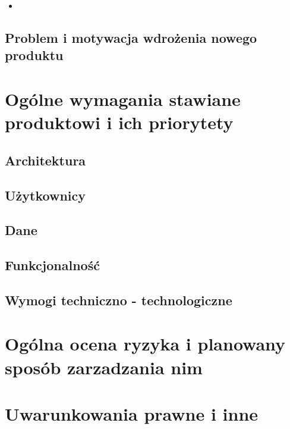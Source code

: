\documentclass[a4paper,10pt]{article}
\begin{document}
\begin{itemize}
 \item 
\end{itemize}

\subsection{Problem i motywacja wdrożenia nowego produktu}
\paragraph{} 


\section{Ogólne wymagania stawiane produktowi i ich priorytety}

\subsection{Architektura}

\subsection{Użytkownicy}

\subsection{Dane}

\subsection{Funkcjonalność}

\subsection{Wymogi techniczno - technologiczne}

\section{Ogólna ocena ryzyka i planowany sposób zarzadzania nim}

\section{Uwarunkowania prawne i inne}
\end{document}
